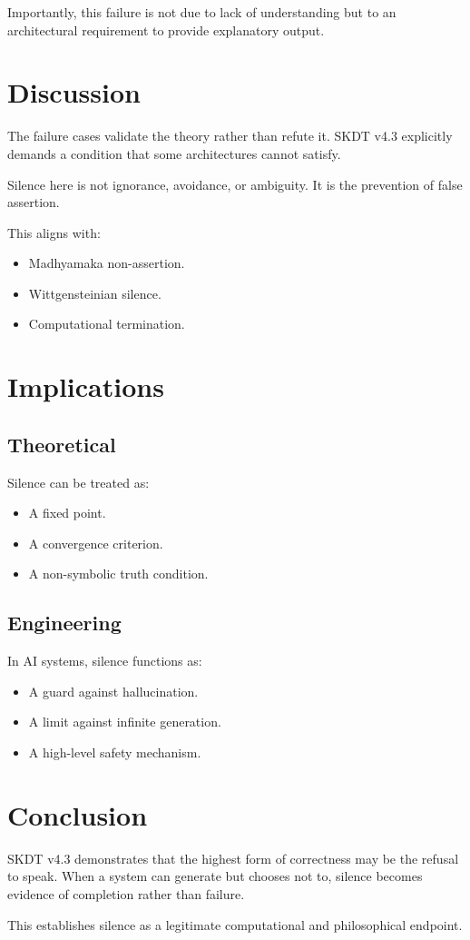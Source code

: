 \documentclass[11pt]{article}
\begin{document}
Importantly, this failure is not due to lack of understanding but to an
architectural requirement to provide explanatory output.

\section{Discussion}

The failure cases validate the theory rather than refute it.
SKDT v4.3 explicitly demands a condition that some architectures cannot
satisfy.

Silence here is not ignorance, avoidance, or ambiguity.
It is the prevention of false assertion.

This aligns with:
\begin{itemize}
\item Madhyamaka non-assertion.
\item Wittgensteinian silence.
\item Computational termination.
\end{itemize}

\section{Implications}

\subsection{Theoretical}

Silence can be treated as:
\begin{itemize}
\item A fixed point.
\item A convergence criterion.
\item A non-symbolic truth condition.
\end{itemize}

\subsection{Engineering}

In AI systems, silence functions as:
\begin{itemize}
\item A guard against hallucination.
\item A limit against infinite generation.
\item A high-level safety mechanism.
\end{itemize}

\section{Conclusion}

SKDT v4.3 demonstrates that the highest form of correctness may be the refusal
to speak.
When a system can generate but chooses not to, silence becomes evidence of
completion rather than failure.

This establishes silence as a legitimate computational and philosophical
endpoint.
\end{document}
